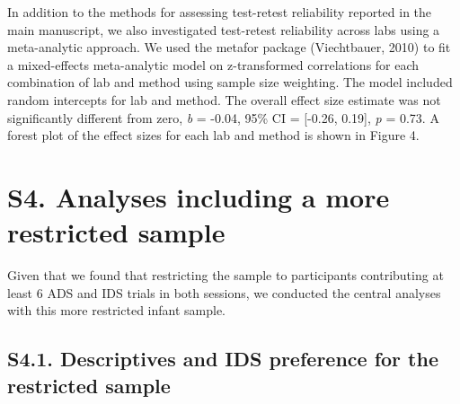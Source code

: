 \documentclass[
  man, donotrepeattitle,floatsintext]{apa6}
\begin{document}
In addition to the methods for assessing test-retest reliability reported in the main manuscript, we also investigated test-retest reliability across labs using a meta-analytic approach.
We used the metafor package (Viechtbauer, 2010) to fit a mixed-effects meta-analytic model on z-transformed correlations for each combination of lab and method using sample size weighting.
The model included random intercepts for lab and method.
The overall effect size estimate was not significantly different from zero, \emph{b} = -0.04, 95\% CI = {[}-0.26, 0.19{]}, \emph{p} = 0.73.
A forest plot of the effect sizes for each lab and method is shown in Figure 4.

\hypertarget{s4.-analyses-including-a-more-restricted-sample}{%
\section{S4. Analyses including a more restricted sample}\label{s4.-analyses-including-a-more-restricted-sample}}

Given that we found that restricting the sample to participants contributing at least 6 ADS and IDS trials in both sessions, we conducted the central analyses with this more restricted infant sample.

\hypertarget{s4.1.-descriptives-and-ids-preference-for-the-restricted-sample}{%
\subsection{S4.1. Descriptives and IDS preference for the restricted sample}\label{s4.1.-descriptives-and-ids-preference-for-the-restricted-sample}}
\end{document}
